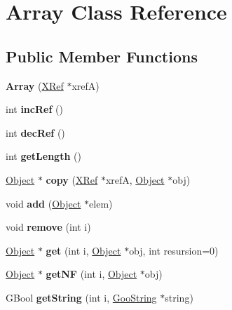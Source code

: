 \hypertarget{class_array}{}\section{Array Class Reference}
\label{class_array}
\subsection*{Public Member Functions}
\begin{DoxyCompactItemize}
\item 
\mbox{\label{class_array_a5052bd061ca31fe7de01fa0f23c7ad1d}} 
{\bfseries Array} (\hyperlink{class_x_ref}{X\+Ref} $\ast$xrefA)
\item 
\mbox{\label{class_array_a1ef0ed71916ca256527d3052797f5363}} 
int {\bfseries inc\+Ref} ()
\item 
\mbox{\label{class_array_ae48f49cf68fc90da10c5b4778bcb1968}} 
int {\bfseries dec\+Ref} ()
\item 
\mbox{\label{class_array_ab8a62c71b9ca0a11ebbf626b9d9e83d0}} 
int {\bfseries get\+Length} ()
\item 
\mbox{\label{class_array_af2741a54b8974db2a39730afc509b8cf}} 
\hyperlink{class_object}{Object} $\ast$ {\bfseries copy} (\hyperlink{class_x_ref}{X\+Ref} $\ast$xrefA, \hyperlink{class_object}{Object} $\ast$obj)
\item 
\mbox{\label{class_array_a5b669d74b8f09b31c3e83458e43508f6}} 
void {\bfseries add} (\hyperlink{class_object}{Object} $\ast$elem)
\item 
\mbox{\label{class_array_a368b214e4cc0a3cdce306a15ef681ca4}} 
void {\bfseries remove} (int i)
\item 
\mbox{\label{class_array_ae766f373f928a355b6ecde42db67f8ab}} 
\hyperlink{class_object}{Object} $\ast$ {\bfseries get} (int i, \hyperlink{class_object}{Object} $\ast$obj, int resursion=0)
\item 
\mbox{\label{class_array_a48b29e3a32d584f484d92d551e8effec}} 
\hyperlink{class_object}{Object} $\ast$ {\bfseries get\+NF} (int i, \hyperlink{class_object}{Object} $\ast$obj)
\item 
\mbox{\label{class_array_ad6452fa1402d6f1a2ca31f19866ef05a}} 
G\+Bool {\bfseries get\+String} (int i, \hyperlink{class_goo_string}{Goo\+String} $\ast$string)
\end{DoxyCompactItemize}


